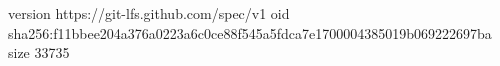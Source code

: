 version https://git-lfs.github.com/spec/v1
oid sha256:f11bbee204a376a0223a6c0ce88f545a5fdca7e1700004385019b069222697ba
size 33735
